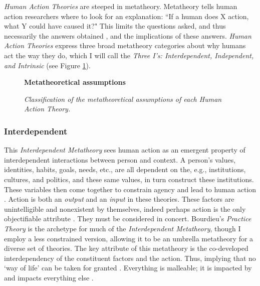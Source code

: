 \documentclass[12 pt]{article}
\begin{document}
	\textit{Human Action Theories} are steeped in metatheory. Metatheory tells human action researchers where to look for an explanation: ``If a human does X action, what Y could have caused it?" This limits the questions asked, and thus necessarily the answers obtained \parencite{Abrams2015}, and the implications of these answers. \textit{Human Action Theories} express three broad metatheory categories about why humans act the way they do, which I will call the \textit{Three I's: Interdependent, Independent, and Intrinsic} (see Figure \ref{fig:meta}). 
\begin{figure}
	\centering
	\textbf{Metatheoretical assumptions} \par \medskip
	\caption{\textit{Classification of the metatheoretical assumptions of each Human Action Theory.}}
	 \label{fig:meta}
\end{figure}	  
	\subsubsection{Interdependent} 
		This \textit{Interdependent Metatheory} sees human action as an emergent property of interdependent interactions between person and context.  A person's values, identities, habits, goals, needs, etc., are all dependent on the, e.g., institutions, cultures, and politics, and these same values, in turn construct these institutions. These variables then come together to constrain agency \parencite{Vigotsky1978} and lead to human action \parencite{Holland1998}. Action is both an \textit{output} and an \textit{input} in these theories.  These factors are unintelligible and nonexistent by themselves, indeed perhaps action is the only objectifiable attribute \parencite{Lewin1939,Bourdieu1977,Heft2012}. They must be considered in concert. Bourdieu's \textit{Practice Theory} is the archetype for much of the \textit{Interdependent Metatheory}, though I employ a less constrained version, allowing it to be an umbrella metatheory for a diverse set of theories. The key attribute of this metatheory is the co-developed interdependency of the constituent factors and the action. Thus, implying that no `way of life' can be taken for granted \parencite{Redclift1996}. Everything is malleable; it is impacted by and impacts everything else \parencite{Shove2010}.
		
\end{document}
